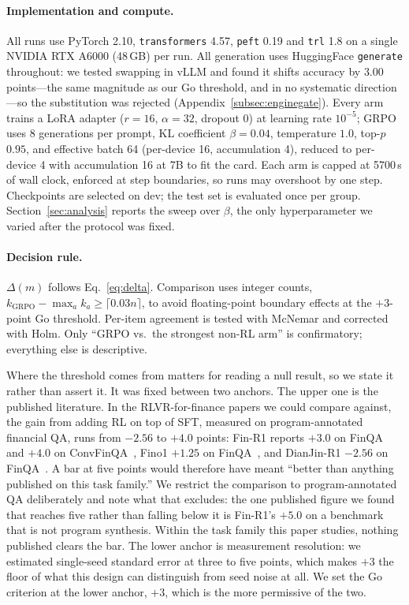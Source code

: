 \paragraph{Implementation and compute.}
All runs use PyTorch 2.10, \texttt{transformers} 4.57, \texttt{peft} 0.19 and
\texttt{trl} 1.8 on a single NVIDIA RTX A6000 (48\,GB) per run. All generation
uses HuggingFace \texttt{generate} throughout: we tested swapping in vLLM and
found it shifts accuracy by $3.00$ points---the same magnitude as our Go
threshold, and in no systematic direction---so the substitution was rejected
(Appendix~\ref{subsec:enginegate}). Every arm
trains a LoRA adapter ($r{=}16$, $\alpha{=}32$, dropout $0$) at learning rate
$10^{-5}$; GRPO uses 8 generations per prompt, KL coefficient $\beta{=}0.04$,
temperature $1.0$, top-$p$ $0.95$, and effective batch 64 (per-device 16,
accumulation 4), reduced to per-device 4 with accumulation 16 at 7B to fit the
card. Each arm is capped at 5700\,s of wall clock, enforced at step boundaries, so
runs may overshoot by one step. Checkpoints are selected on
dev; the test set is evaluated once per group. Section~\ref{sec:analysis}
reports the sweep over $\beta$, the only hyperparameter we
varied after the protocol was fixed.

\paragraph{Decision rule.}
$\Delta(m)$ follows Eq.~\eqref{eq:delta}. Comparison uses integer counts,
$k_{\text{GRPO}} - \max_a k_a \geq \lceil 0.03n \rceil$, to avoid
floating-point boundary effects at the $+3$-point Go threshold. Per-item
agreement is tested with McNemar and corrected with Holm.
Only ``GRPO vs.\ the strongest non-RL arm'' is confirmatory; everything else is
descriptive.

Where the threshold comes from matters for reading a null result, so we state it
rather than assert it. It was fixed between two anchors. The upper one is the
published literature. In the RLVR-for-finance papers we could compare against,
the gain from adding RL on top of SFT, measured on program-annotated financial
QA, runs from $-2.56$ to $+4.0$ points: Fin-R1 reports $+3.0$ on FinQA and
$+4.0$ on ConvFinQA~\cite{finr1_2025}, Fino1 $+1.25$ on
FinQA~\cite{fino1_2025}, and DianJin-R1 $-2.56$ on
FinQA~\cite{dianjinr1_2025}. A bar at five points would therefore have meant
``better than anything published on this task family.'' We restrict the
comparison to program-annotated QA deliberately and note what that excludes: the
one published figure we found that reaches five rather than falling below it is
Fin-R1's $+5.0$ on a benchmark that is not program synthesis. Within the task
family this paper studies, nothing published clears the bar. The lower anchor is
measurement resolution: we estimated single-seed
standard error at three to five points, which makes $+3$ the floor of what this
design can distinguish from seed noise at all. We set the Go criterion at the
lower anchor, $+3$, which is the more permissive of the two.

